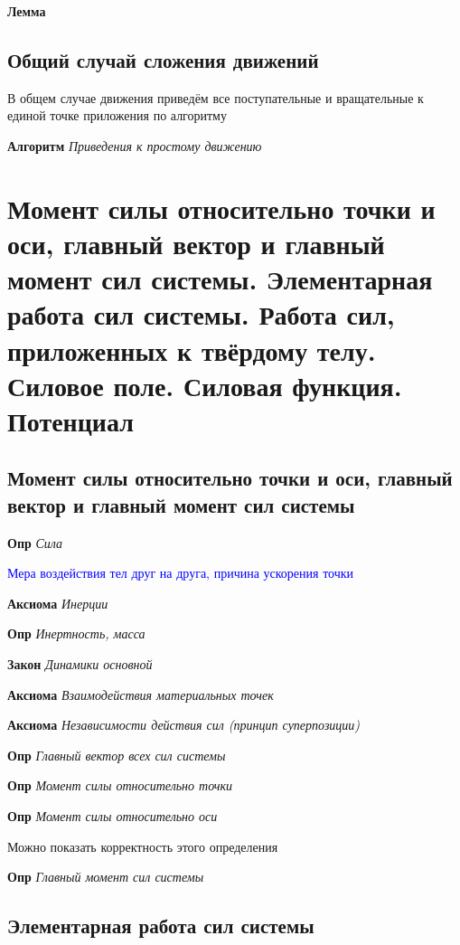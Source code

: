 \documentclass[a4paper, 14pt]{article}
\begin{document}
    \textbf{Лемма}
    
    \subsection{Общий случай сложения движений}
    
    В общем случае движения приведём все поступательные и вращательные к единой точке приложения по алгоритму
    
    \textbf{Алгоритм} \textit{Приведения к простому движению}
    
    \section{Момент силы относительно точки и оси, главный вектор и главный момент сил системы.
    Элементарная работа сил системы.
    Работа сил, приложенных к твёрдому телу.
    Силовое поле.
    Силовая функция.
    Потенциал}
    
    \subsection{Момент силы относительно точки и оси, главный вектор и главный момент сил системы}
    
    \textbf{Опр} \textit{Сила}
    
    \textcolor{blue}{Мера воздействия тел друг на друга, причина ускорения точки}
    
    \textbf{Аксиома} \textit{Инерции}
    
    \textbf{Опр} \textit{Инертность, масса}
    
    \textbf{Закон} \textit{Динамики основной}
    
    \textbf{Аксиома} \textit{Взаимодействия материальных точек}
    
    \textbf{Аксиома} \textit{Независимости действия сил (принцип суперпозиции)}
    
    \textbf{Опр} \textit{Главный вектор всех сил системы}
    
    \textbf{Опр} \textit{Момент силы относительно точки}
    
    \textbf{Опр} \textit{Момент силы относительно оси}
    
    Можно показать корректность этого определения
    
    \textbf{Опр} \textit{Главный момент сил системы}
    
    \subsection{Элементарная работа сил системы}
    
\end{document}
